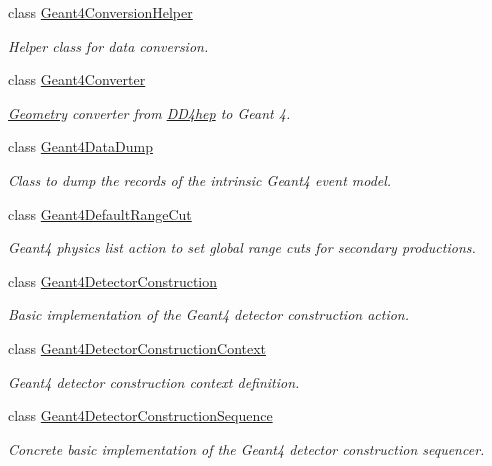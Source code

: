 \begin{DoxyCompactItemize}
class \hyperlink{class_d_d4hep_1_1_simulation_1_1_geant4_conversion_helper}{Geant4\+Conversion\+Helper}
\begin{DoxyCompactList}\small\item\em Helper class for data conversion. \end{DoxyCompactList}\item 
class \hyperlink{class_d_d4hep_1_1_simulation_1_1_geant4_converter}{Geant4\+Converter}
\begin{DoxyCompactList}\small\item\em \hyperlink{namespace_d_d4hep_1_1_geometry}{Geometry} converter from \hyperlink{namespace_d_d4hep}{D\+D4hep} to Geant 4. \end{DoxyCompactList}\item 
class \hyperlink{class_d_d4hep_1_1_simulation_1_1_geant4_data_dump}{Geant4\+Data\+Dump}
\begin{DoxyCompactList}\small\item\em Class to dump the records of the intrinsic Geant4 event model. \end{DoxyCompactList}\item 
class \hyperlink{class_d_d4hep_1_1_simulation_1_1_geant4_default_range_cut}{Geant4\+Default\+Range\+Cut}
\begin{DoxyCompactList}\small\item\em Geant4 physics list action to set global range cuts for secondary productions. \end{DoxyCompactList}\item 
class \hyperlink{class_d_d4hep_1_1_simulation_1_1_geant4_detector_construction}{Geant4\+Detector\+Construction}
\begin{DoxyCompactList}\small\item\em Basic implementation of the Geant4 detector construction action. \end{DoxyCompactList}\item 
class \hyperlink{class_d_d4hep_1_1_simulation_1_1_geant4_detector_construction_context}{Geant4\+Detector\+Construction\+Context}
\begin{DoxyCompactList}\small\item\em Geant4 detector construction context definition. \end{DoxyCompactList}\item 
class \hyperlink{class_d_d4hep_1_1_simulation_1_1_geant4_detector_construction_sequence}{Geant4\+Detector\+Construction\+Sequence}
\begin{DoxyCompactList}\small\item\em Concrete basic implementation of the Geant4 detector construction sequencer. \end{DoxyCompactList}\item 

\end{DoxyCompactItemize}
